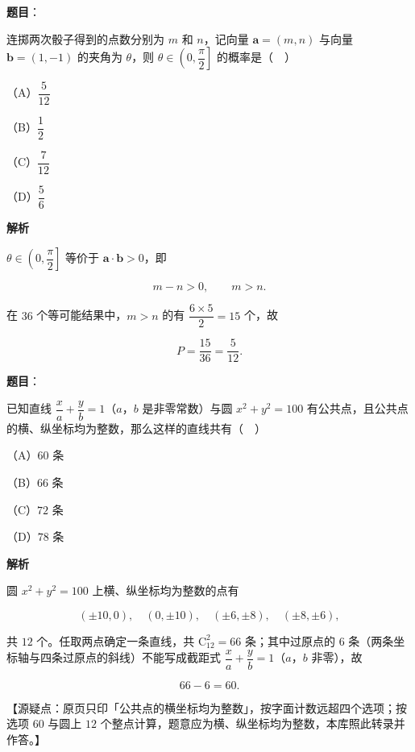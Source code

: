 \begin{answer}

\textbf{题目}：

连掷两次骰子得到的点数分别为 $m$ 和 $n$，记向量 $\boldsymbol a=(m,n)$ 与向量 $\boldsymbol b=(1,-1)$ 的夹角为 $\theta$，则 $\theta\in\left(0,\dfrac{\pi}2\right]$ 的概率是（　）

（A）$\dfrac5{12}$

（B）$\dfrac12$

（C）$\dfrac7{12}$

（D）$\dfrac56$

\textbf{解析}

$\theta\in\left(0,\dfrac{\pi}2\right]$ 等价于 $\boldsymbol a\cdot\boldsymbol b>0$，即

\nopagebreak[4]
\[m-n>0,\qquad m>n.\]

在 $36$ 个等可能结果中，$m>n$ 的有 $\dfrac{6\times5}2=15$ 个，故

\nopagebreak[4]
\[P=\frac{15}{36}=\frac5{12}.\]


\end{answer}
\begin{answer}

\textbf{题目}：

已知直线 $\dfrac xa+\dfrac yb=1$（$a$，$b$ 是非零常数）与圆 $x^2+y^2=100$ 有公共点，且公共点的横、纵坐标均为整数，那么这样的直线共有（　）

（A）$60$ 条

（B）$66$ 条

（C）$72$ 条

（D）$78$ 条

\textbf{解析}

圆 $x^2+y^2=100$ 上横、纵坐标均为整数的点有

\nopagebreak[4]
\[(\pm10,0),\quad(0,\pm10),\quad(\pm6,\pm8),\quad(\pm8,\pm6),\]

共 $12$ 个。任取两点确定一条直线，共 $\mathrm C_{12}^2=66$ 条；其中过原点的 $6$ 条（两条坐标轴与四条过原点的斜线）不能写成截距式 $\dfrac xa+\dfrac yb=1$（$a$，$b$ 非零），故

\nopagebreak[4]
\[66-6=60.\]

【源疑点：原页只印「公共点的横坐标均为整数」，按字面计数远超四个选项；按选项 $60$ 与圆上 $12$ 个整点计算，题意应为横、纵坐标均为整数，本库照此转录并作答。】


\end{answer}

